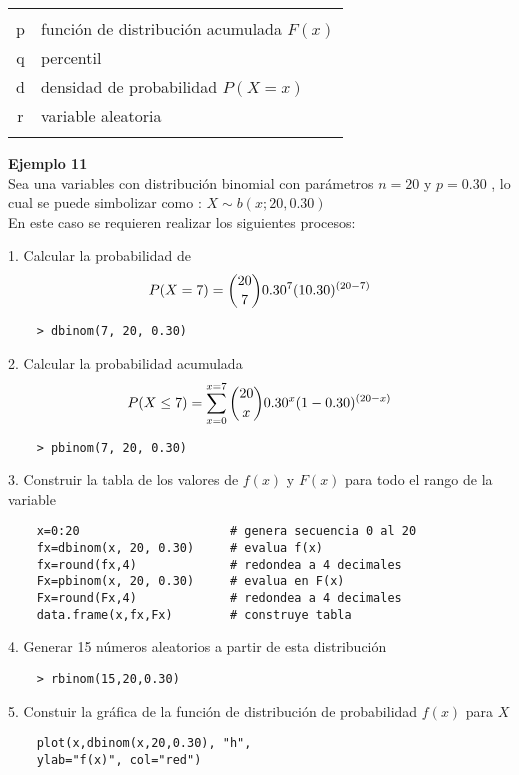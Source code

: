\documentclass[base=hide,12pt]{elegantbook}
\begin{document}
\begin{tabular}{cl}
	&\\
	p & función de distribución acumulada $F(x)$\\
	q & percentil \\
	d & densidad de probabilidad $P(X=x)$ \\
	r & variable aleatoria \\
	&\\
\end{tabular}

\textcolor{col3}{\bf Ejemplo 11}\\
Sea una variables con distribución binomial con parámetros $n=20$ y $p=0.30$ , lo cual se puede simbolizar como : $X\sim b(x; 20,0.30)$ \\

En este caso se requieren realizar los siguientes procesos:

1. Calcular la probabilidad de $$ P(X=7) = \dbinom{20}{7} 0.30^{7} (10.30)^{(20-7)}$$

\begin{lstlisting}
	> dbinom(7, 20, 0.30)
\end{lstlisting}

2. Calcular la probabilidad acumulada $$P(X \leq 7) = \displaystyle\sum_{x=0}^{x=7} \dbinom{20}{x} 0.30^{x} (1-0.30)^{(20-x)}$$

\begin{lstlisting}
	> pbinom(7, 20, 0.30)
\end{lstlisting}

3. Construir la tabla de los  valores de $f(x)$ y $F(x)$ para todo el rango de la variable\\  
\begin{lstlisting}
	x=0:20                     # genera secuencia 0 al 20
	fx=dbinom(x, 20, 0.30)     # evalua f(x)
	fx=round(fx,4)             # redondea a 4 decimales
	Fx=pbinom(x, 20, 0.30)     # evalua en F(x)
	Fx=round(Fx,4)             # redondea a 4 decimales
	data.frame(x,fx,Fx)        # construye tabla
\end{lstlisting}

4. Generar 15 números aleatorios a partir de esta distribución \\
\begin{lstlisting}
	> rbinom(15,20,0.30)
\end{lstlisting}


5. Constuir la gráfica de la función de distribución de probabilidad $f(x)$ para $X$ \\
\begin{lstlisting}
	plot(x,dbinom(x,20,0.30), "h", 
	ylab="f(x)", col="red")
\end{lstlisting}
\end{document}
